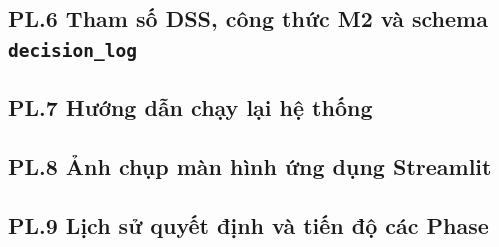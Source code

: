 \documentclass[a4paper]{article}
\begin{document}
\label{pl:6}
\subsection*{PL.6 Tham số DSS, công thức M2 và schema \texttt{decision\_log}}

\label{pl:7}
\subsection*{PL.7 Hướng dẫn chạy lại hệ thống}

\label{pl:8}
\subsection*{PL.8 Ảnh chụp màn hình ứng dụng Streamlit}

\label{pl:9}
\subsection*{PL.9 Lịch sử quyết định và tiến độ các Phase}
\end{document}
